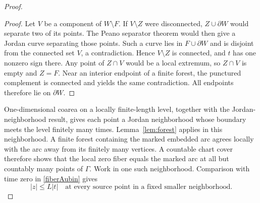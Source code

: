 \documentclass[11pt]{article}
\begin{document}
\begin{proof}
\begin{proof}
Let $V$ be a component of $W\setminus F$. If $V\setminus Z$ were disconnected, $Z\cup\partial W$ would separate two of its points. The Peano separator theorem would then give a Jordan curve separating those points. Such a curve lies in $F\cup\partial W$ and is disjoint from the connected set $V$, a contradiction. Hence $V\setminus Z$ is connected, and $t$ has one nonzero sign there. Any point of $Z\cap V$ would be a local extremum, so $Z\cap V$ is empty and $Z=F$. Near an interior endpoint of a finite forest, the punctured complement is connected and yields the same contradiction. All endpoints therefore lie on $\partial W$.
\end{proof}
One-dimensional coarea on a locally finite-length level, together with the Jordan-neighborhood result, gives each point a Jordan neighborhood whose boundary meets the level finitely many times. Lemma~\ref{lem:forest} applies in this neighborhood. A finite forest containing the marked embedded arc agrees locally with the arc away from its finitely many vertices. A countable chart cover therefore shows that the local zero fiber equals the marked arc at all but countably many points of $\Gamma$. Work in one such neighborhood. Comparison with time zero in \eqref{fiberAubin} gives
\begin{equation}\label{heightbound}
 |z|\le L|t|\quad\text{at every source point in a fixed smaller neighborhood.}
\end{equation}


\end{proof}
\end{document}
